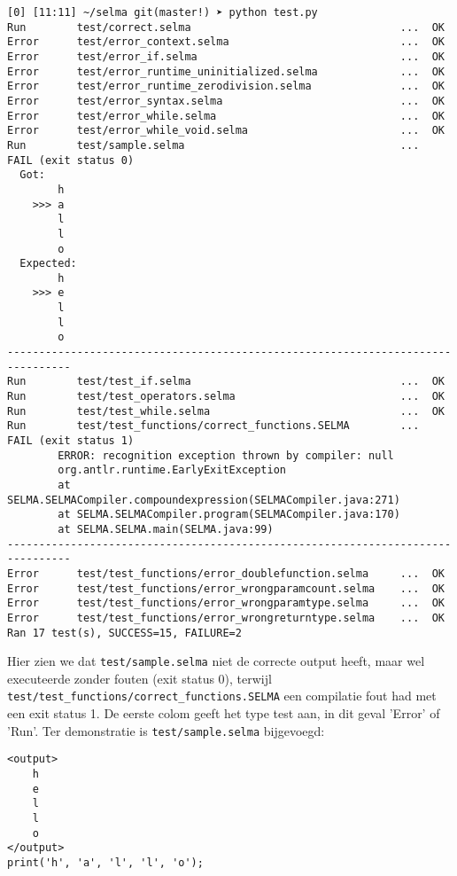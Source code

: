 \documentclass[]{article}
\begin{document}
\begin{lstlisting}[style=SELMA]
[0] [11:11] ~/selma git(master!) ➤ python test.py
Run        test/correct.selma                                 ...  OK
Error      test/error_context.selma                           ...  OK
Error      test/error_if.selma                                ...  OK
Error      test/error_runtime_uninitialized.selma             ...  OK
Error      test/error_runtime_zerodivision.selma              ...  OK
Error      test/error_syntax.selma                            ...  OK
Error      test/error_while.selma                             ...  OK
Error      test/error_while_void.selma                        ...  OK
Run        test/sample.selma                                  ...  FAIL (exit status 0)
  Got:
        h
    >>> a
        l
        l
        o
  Expected:
        h
    >>> e
        l
        l
        o
--------------------------------------------------------------------------------
Run        test/test_if.selma                                 ...  OK
Run        test/test_operators.selma                          ...  OK
Run        test/test_while.selma                              ...  OK
Run        test/test_functions/correct_functions.SELMA        ...  FAIL (exit status 1)
        ERROR: recognition exception thrown by compiler: null
        org.antlr.runtime.EarlyExitException
        at SELMA.SELMACompiler.compoundexpression(SELMACompiler.java:271)
        at SELMA.SELMACompiler.program(SELMACompiler.java:170)
        at SELMA.SELMA.main(SELMA.java:99)
--------------------------------------------------------------------------------
Error      test/test_functions/error_doublefunction.selma     ...  OK
Error      test/test_functions/error_wrongparamcount.selma    ...  OK
Error      test/test_functions/error_wrongparamtype.selma     ...  OK
Error      test/test_functions/error_wrongreturntype.selma    ...  OK
Ran 17 test(s), SUCCESS=15, FAILURE=2
\end{lstlisting}

Hier zien we dat \texttt{test/sample.selma} niet de correcte output heeft, maar wel executeerde zonder fouten (exit status 0), terwijl \texttt{test/test\_functions/correct\_functions.SELMA} een compilatie fout had met een exit status 1. De eerste colom geeft het type test aan, in dit geval 'Error' of 'Run'. Ter demonstratie is \texttt{test/sample.selma} bijgevoegd:


\begin{lstlisting}[style=SELMA]
<output>
    h
    e
    l
    l
    o
</output>
print('h', 'a', 'l', 'l', 'o');
\end{lstlisting}
\end{document}
